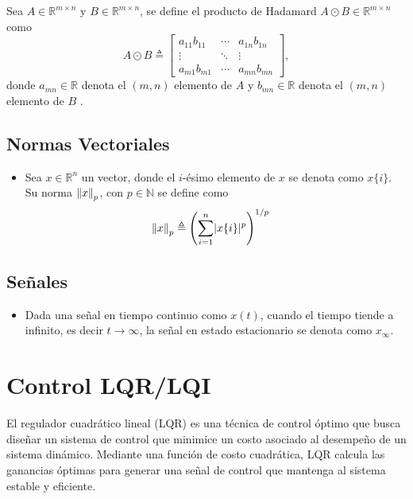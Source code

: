 Sea $A \in \mathbb{R}^{m\times n}$ y $B \in \mathbb{R}^{m\times n}$, se define el producto de Hadamard $A\odot B \in \mathbb{R}^{m \times n}$ como
\begin{equation*}
    A \odot B \triangleq \begin{bmatrix} 
    a_{11} b_{11} & \cdots & a_{1n} b_{1n} \\
    \vdots & \ddots & \vdots \\
    a_{m1}b_{m1} & \cdots & a_{mn}b_{mn}
    \end{bmatrix},
\end{equation*}
donde $a_{mn} \in \mathbb{R}$ denota el $(m,n)$ elemento de $A$ y $b_{mn} \in \mathbb{R}$ denota el $(m,n)$ elemento de $B$ \cite{bernstein2009matrix}.


\subsection{Normas Vectoriales}

\begin{itemize}
    \item Sea $x \in \mathbb{R}^{n}$ un vector, donde el $i$-ésimo elemento de $x$ se denota como $x\{i\}$. Su norma $\left\lVert x\right\rVert_p$, con $p \in \mathbb{N}$ se define como
    \begin{align*}
        \left\lVert x\right\rVert_p &\triangleq \left( \sum_{i=1}^n \lvert x \{i \}\rvert^p \right)^{1/p}
    \end{align*} 
\end{itemize}

\subsection{Señales}

\begin{itemize}
    \item Dada una señal en tiempo continuo como $x(t)$, cuando el tiempo tiende a infinito, es decir $t \to \infty$, la señal en estado estacionario se denota como $x_\infty$.
\end{itemize}

\section{Control LQR/LQI} \label{sec:lqicontrol}

El regulador cuadrático lineal (LQR) es una técnica de control óptimo que busca diseñar un sistema de control que minimice un costo asociado al desempeño de un sistema dinámico. Mediante una función de costo cuadrática, LQR calcula las ganancias óptimas para generar una señal de control que mantenga al sistema estable y eficiente.



